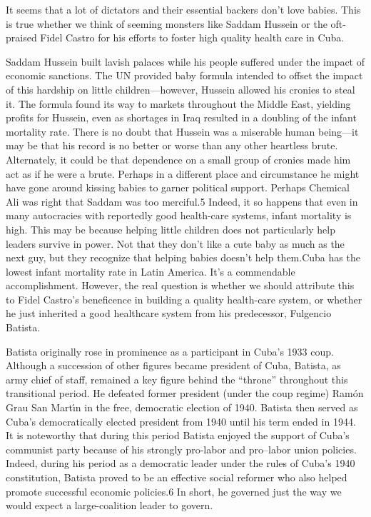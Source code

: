 \documentclass[10pt]{article}
\begin{document}
{\large It seems that a lot of dictators and their essential backers don't love
babies. This is true whether we think of seeming monsters like Saddam Hussein or
the oft-praised Fidel Castro for his efforts to foster high quality health care
in Cuba.}

{\large Saddam Hussein built lavish palaces while his people suffered under the
impact of economic sanctions. The UN provided baby formula intended to offset the
impact of this hardship on little children---however, Hussein allowed his cronies
to steal it. The formula found its way to markets throughout the Middle East,
yielding profits for Hussein, even as shortages in Iraq resulted in a doubling of
the infant mortality rate. There is no doubt that Hussein was a miserable human
being---it may be that his record is no better or worse than any other heartless
brute. Alternately, it could be that dependence on a small group of cronies made
him act as if he were a brute. Perhaps in a different place and circumstance he
might have gone around kissing babies to garner political support. Perhaps
Chemical Ali was right that Saddam was too merciful.5 Indeed, it so happens that
even in many autocracies with reportedly good health-care systems, infant
mortality is high. This may be because helping little children does not
particularly help leaders survive in power. Not that they don't like a cute baby
as much as the next guy, but they recognize that helping babies doesn't help
them.Cuba has the lowest infant mortality rate in Latin America. It's a
commendable accomplishment. However, the real question is whether we should
attribute this to Fidel Castro's beneficence in building a quality health-care
system, or whether he just inherited a good healthcare system from his
predecessor, Fulgencio Batista.}

{\large Batista originally rose in prominence as a participant in Cuba's 1933
coup. Although a succession of other figures became president of Cuba, Batista,
as army chief of staff, remained a key figure behind the ``throne'' throughout
this transitional period. He defeated former president (under the coup regime)
Ram\'{o}n Grau San Mart\'{\i}n in the free, democratic election of 1940. Batista
then served as Cuba's democratically elected president from 1940 until his term
ended in 1944. It is noteworthy that during this period Batista enjoyed the
support of Cuba's communist party because of his strongly pro-labor and
pro--labor union policies. Indeed, during his period as a democratic leader under
the rules of Cuba's 1940 constitution, Batista proved to be an effective social
reformer who also helped promote successful economic policies.6 In short, he
governed just the way we would expect a large-coalition leader to govern.}
\end{document}
